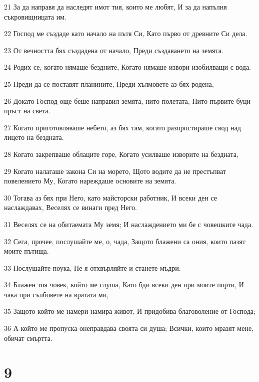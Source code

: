 \par 21 За да направя да наследят имот тия, които ме любят, И за да напълня съкровищницата им.
\par 22 Господ ме създаде като начало на пътя Си, Като първо от древните Си дела.
\par 23 От вечността бях създадена от начало, Преди създаването на земята.
\par 24 Родих се, когато нямаше бездните, Когато нямаше извори изобилващи с вода.
\par 25 Преди да се поставят планините, Преди хълмовете аз бях родена,
\par 26 Докато Господ още беше направил земята, нито полетата, Нито първите буци пръст на света.
\par 27 Когато приготовляваше небето, аз бях там, когато разпростираше свод над лицето на бездната.
\par 28 Когато закрепваше облаците горе, Когато усилваше изворите на бездната,
\par 29 Когато налагаше закона Си на морето, Щото водите да не престъпват повелението Му, Когато нареждаше основите на земята.
\par 30 Тогава аз бях при Него, като майсторски работник, И всеки ден се наслаждавах, Веселях се винаги пред Него.
\par 31 Веселях се на обитаемата Му земя; И наслаждението ми бе с човешките чада.
\par 32 Сега, прочее, послушайте ме, о, чада, Защото блажени са ония, които пазят моите пътища.
\par 33 Послушайте поука, Не я отхвърляйте и станете мъдри.
\par 34 Блажен тоя човек, който ме слуша, Като бди всеки ден при моите порти, И чака при сълбовете на вратата ми,
\par 35 Защото който ме намери намира живот, И придобива благоволение от Господа;
\par 36 А който ме пропуска онеправдава своята си душа; Всички, които мразят мене, обичат смъртта.

\chapter{9}

